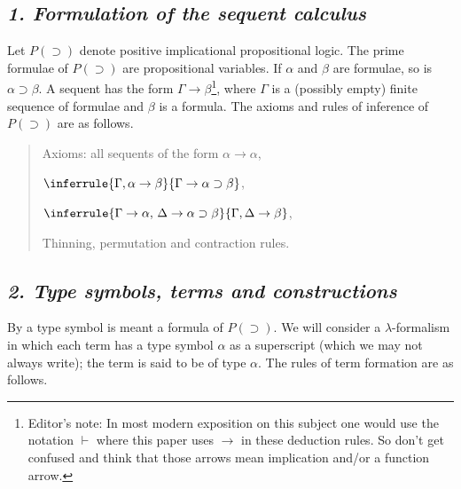 \documentclass[12pt]{article}
\def\imp{\rightarrow}
\def\l{\lambda}
\def\D{D}
\def\limp{\supset}
\def\PI{P(\limp)}
\def\G{\Gamma}
\def\a{\alpha}
\def\b{\beta}
\def\D{\Delta}
\def\ab{\a \imp \b}
\begin{document}
\subsection{\it 1. Formulation of the sequent calculus}

Let $\PI$ denote positive implicational propositional logic. The prime formulae of $\PI$ are propositional variables. If $\a$ and $\b
$ are formulae, so is $\a \limp \b$. A sequent has the form $\G \imp \b$\footnote{Editor's note: In most modern exposition on this subject one would use the notation $\vdash$ where this paper uses $\imp$ in these deduction rules. So don't get confused and think that those arrows mean implication and/or a function arrow.}, where $\G$ is a (possibly empty) finite sequence of formulae and $\b$ is a formula. The axioms and rules of inference of $\PI$ are as follows.

\begin{quote}
\begin{description}[font=\normalfont]

\item[(1.1)] Axioms: all sequents of the form $\a \imp \a$,

\item[(1.2)] $\inferrule {\G, \ab}{\G \imp \a \limp \b}$,

\item[(1.3)] $\inferrule {\G \imp \a, \, \D \imp \a \limp \b}{\G, \D \imp \b}$,

\item[(1.4)] Thinning, permutation and contraction rules.
\end{description}
\end{quote}

\subsection{\it 2. Type symbols, terms and constructions}

By a type symbol is meant a formula of $\PI$. We will consider a $\l$-formalism in which each term has a type symbol $\a$ as a superscript (which we may not always write); the term is said to be of type $\a$. The rules of term formation are as follows.
\end{document}
